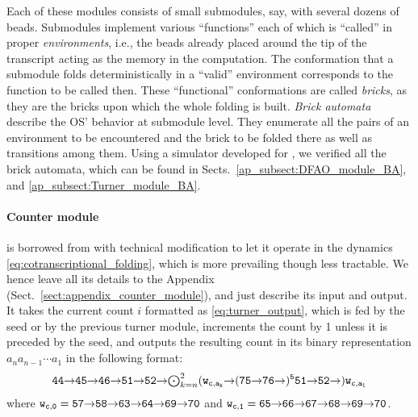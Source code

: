 \documentclass[runningheads]{llncs}
\newcommand{\east}{{\ensuremath \to}}
\begin{document}
Each of these modules consists of small submodules, say, with several dozens of beads. 
Submodules implement various ``functions'' each of which is ``called'' in proper \textit{environments}, i.e., the beads already placed around the tip of the transcript acting as the memory in the computation. 
The conformation that a submodule folds deterministically in a ``valid'' environment corresponds to the function to be called then. 
These ``functional'' conformations are called \textit{bricks}, as they are the bricks upon which the whole folding is built. 
\textit{Brick automata} describe the OS' behavior at submodule level. 
They enumerate all the pairs of an environment to be encountered and the brick to be folded there as well as transitions among them. 
Using a simulator developed for \cite{HaKiOtSe2016}, we verified all the brick automata, which can be found in Sects.~\ref{ap_subsect:DFAO_module_BA}, and \ref{ap_subsect:Turner_module_BA}. 


\paragraph{Counter module} is borrowed from \cite{GeMeScSe2016} with technical modification to let it operate in the dynamics \eqref{eq:cotranscriptional_folding}, which is more prevailing \cite{HanKim2017,HaKiOtSe2016,OtaSeki2017} though less tractable. 
We hence leave all its details to the Appendix (Sect.~\ref{sect:appendix_counter_module}), and just describe its input and output. 
It takes the current count $i$ formatted as \eqref{eq:turner_output}, which is fed by the seed or by the previous turner module, increments the count by 1 unless it is preceded by the seed, and outputs the resulting count in its binary representation $a_n a_{n-1} \cdots a_1$ in the following format:
\begin{equation}\label{eq:counter_output}{\tt 
	44 \east 45 \east 46 \east 51 \east 52 \east \mbox{$\bigodot_{k = n}^2$} (w_{c, a_k} \east (75 \east 76 \east)^5 51 \east 52 \east) w_{c, a_1}
}\end{equation}
where ${\tt w_{c, 0} = 57 \east 58 \east 63 \east 64 \east 69 \east 70}$ and ${\tt w_{c, 1} = 65 \east 66 \east 67 \east 68 \east 69 \east 70}$. 
\end{document}
